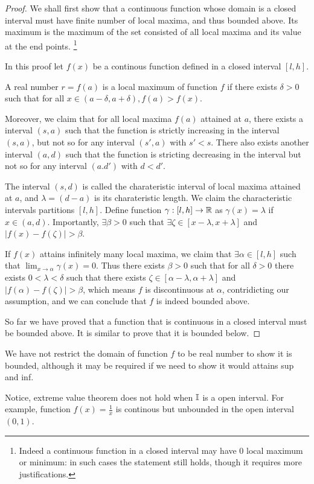 \documentclass[../note.tex]{subfiles}
\begin{document}
\begin{proof}
	We shall first show that a continuous function whose domain is a closed interval must have finite number of local maxima, and thus bounded above. Its maximum is the maximum of the set consisted of all local maxima and its value at the end points. 
	\footnote{
		Indeed a continuous function in a closed interval may have 0 local maximum or minimum: in such cases the statement still holds, though it requires more justifications.
	}

	In this proof let $f(x)$ be a continous function defined in a closed interval $[l, h]$.

	A real number $r = f(a)$ is a local maximum of function $f$ if there exists $\delta > 0$ such that for all $x \in(a-\delta, a+\delta), f(a)>f(x)$. 

	Moreover, we claim that for all local maxima $f(a)$ attained at $a$, there exists a interval $(s, a)$  such that the function is strictly increasing in the interval $(s,a)$, but not so for any interval $(s', a)$ with $s'<s$. 
	There also exists another interval $(a, d)$ such that the function is stricting decreasing in the interval but not so for any interval $(a. d')$ with $d<d'$.

	The interval $(s,d)$ is called the charateristic interval of local maxima attained at $a$, and $\lambda = (d-a)$ is its charateristic length. 
	We claim the characteristic intervals partitions $[l,h]$.
	Define function $\gamma: [l,h] \rightarrow \mathbb{R}$ as $\gamma(x) = \lambda$ if $x\in (a,d)$. Importantly, $\exists \beta > 0$ such that $\exists \zeta \in [x-\lambda,x+\lambda]$ and $|f(x)-f(\zeta)|>\beta$.
	
	If $f(x)$ attains infinitely many local maxima, we claim that $\exists \alpha \in [l, h]$ such that $\displaystyle \lim_{x\to \alpha} \gamma (x) = 0$.
	Thus there exists $\beta > 0$ such that for all $\delta>0$ there exists $0<\lambda<\delta$ such that there exists $\zeta \in [\alpha-\lambda, \alpha+\lambda]$ and $|f(\alpha)-f(\zeta)|>\beta$, which means $f$ is discontinuous at $\alpha$, contridicting our assumption, and we can conclude that $f$ is indeed bounded above.

	So far we have proved that a function that is continuous in a closed interval must be bounded above. It is similar to prove that it is bounded below.
\end{proof}
\begin{remark}
	We have not restrict the domain of function $f$ to be real number to show it is bounded, although it may be required if we need to show it would attains sup and inf.

	Notice, extreme value theorem does not hold when $\mathbb{I}$ is a open interval. For example, function $f(x)=\frac{1}{x}$ is continous but unbounded in the open interval $(0,1)$.
\end{remark}
\end{document}

